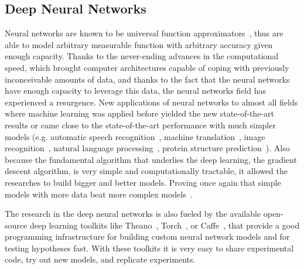 \documentclass[10pt,twocolumn]{article}
\begin{document}
\subsection{Deep Neural Networks}
Neural networks are known to be universal function approximators~\cite{hornik1989multilayer}, thus are able to model arbitrary measurable function with arbitrary accuracy given enough capacity. Thanks to the never-ending advances in the computational speed, which brought computer architectures capable of coping with previously inconceivable amounts of data, and thanks to the fact that the neural networks have enough capacity to leverage this data, the neural networks field has experienced a resurgence. New applications of neural networks to almost all fields where machine learning was applied before yielded the new state-of-the-art results or came close to the state-of-the-art performance with much simpler models (e.g. automatic speech recognition~\cite{graves2005framewise}, machine translation~\cite{sutskever2014sequence}, image recognition~\cite{karpathy2014deep}, natural language processing~\cite{socher2012semantic}, protein structure prediction~\cite{sonderby2014protein}). Also because the fundamental algorithm that underlies the deep learning, the gradient descent algorithm, is very simple and computationally tractable, it allowed the researches to build bigger and better models. Proving once again that simple models with more data beat more complex models~\cite{halevy2009unreasonable}.

The research in the deep neural networks is also fueled by the available open-source deep learning toolkits like Theano~\cite{bastien2012theano}, Torch~\cite{collobert2011torch7}, or Caffe~\cite{jia2014caffe}, that provide a good programming infrastructure for building custom neural network models and for testing hypotheses fast. With these toolkits it is very easy to share experimental code, try out new models, and replicate experiments.
\end{document}
